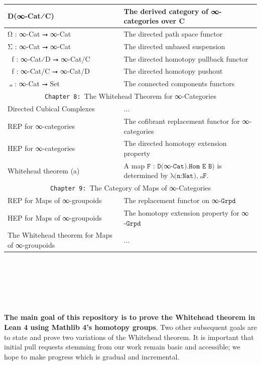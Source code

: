 \documentclass{book}
\theoremstyle{definition}
\newcounter{pcounter}
\newcounter{sectioncount}
\newcounter{subsectioncount}
\renewcommand{\section}[1]{\newpage\ \\ \ \\ \begin{center} \scalebox{1.5}{\texttt{\thesectioncount . #1}} \stepcounter{sectioncount} \setcounter{subsectioncount}{1} \end{center} \begin{center} \ \\ \ \\ \thispagestyle{empty} \end{center}}
\begin{document}
{\begin{longtable}{|| l || l ||}
D(∞-Cat⁄C) & The derived category of ∞-categories over C \\
\hline
Ω⃗ : ∞-Cat ⭢ ∞-Cat & The directed path space functor \\
 \hline 
 Σ⃗ : ∞-Cat ⭢ ∞-Cat & The directed unbased suspension \\
\hline 
ω⃗ f : ∞-Cat⁄D ⭢ ∞-Cat/C & The directed homotopy pullback functor\\
 \hline 
 σ⃗ f : ∞-Cat/C ⭢ ∞-Cat/D & The directed homotopy pushout \\
 \hline 
π⃗ₙ : ∞-Cat ⭢ Set & The connected components functors\\
 \hline \hline
 \multicolumn{2}{||c||}{\texttt{Chapter 8: }The Whitehead Theorem for ∞-Categories} \\
\hline \hline
Directed Cubical Complexes & ...\\
\hline
REP for ∞-categories & The cofibrant replacement functor for ∞-categories\\
\hline
HEP for ∞-categories & The directed homotopy extension property\\
\hline 
Whitehead theorem (a) & A map $\texttt{F : D(}$∞$\texttt{-Cat).Hom E B)}$ is determined by $\texttt{λ(n:Nat),}$π⃗ₙ$\texttt{F}$.\\
\hline \hline
\multicolumn{2}{||c||}{\texttt{Chapter 9: }The Category of Maps of ∞-Categories} \\
\hline \hline
REP for Maps of ∞-groupoids & The replacement functor on ∞$\texttt{-Grpd}$ \\
\hline
HEP for Maps of ∞-groupoids & The homotopy extension property for ∞$\texttt{-Grpd}$\\
 \hline 
The Whitehead theorem for Maps of ∞-groupoids & ... \\
\hline \hline
\end{longtable}
}



\newpage
\section{Introduction}

{\bf The main goal of this repository is to prove the Whitehead theorem in Lean 4 using Mathlib 4's homotopy groups}. Two other subsequent goals are to state and prove two variations of the Whitehead theorem. It is important that initial pull requests stemming from our work remain basic and accessible; we hope to make progress which is gradual and incremental.\\
\end{document}
